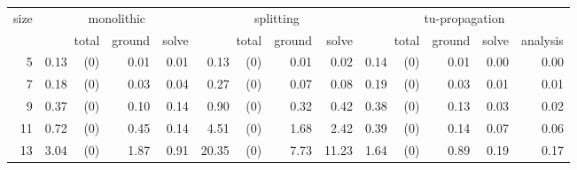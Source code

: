 \documentclass[11pt,fleqn,twoside]{article}
\begin{document}
			\begin{table}[t]
				\small
				\centering
				\setlength\tabcolsep{1.5pt}
				\begin{tabular}[t]{|r|r|r|r|r|r|r|r|r|r|r|}
					\hline
					size & \multicolumn{3}{c|}{monolithic} & \multicolumn{3}{c|}{splitting} & \multicolumn{4}{c|}{tu-propagation} \\
					& total & ground & solve & total & ground & solve & total & ground & solve & analysis \\
					\hline
5      & 0.13 ~~(0) & 0.01     & 0.01     & 0.13 ~~(0) & 0.01     & 0.02     & 0.14 ~~(0) & 0.01     & 0.00     & 0.00     \\
7      & 0.18 ~~(0) & 0.03     & 0.04     & 0.27 ~~(0) & 0.07     & 0.08     & 0.19 ~~(0) & 0.03     & 0.01     & 0.01     \\
9      & 0.37 ~~(0) & 0.10     & 0.14     & 0.90 ~~(0) & 0.32     & 0.42     & 0.38 ~~(0) & 0.13     & 0.03     & 0.02     \\
11      & 0.72 ~~(0) & 0.45     & 0.14     & 4.51 ~~(0) & 1.68     & 2.42     & 0.39 ~~(0) & 0.14     & 0.07     & 0.06     \\
13      & 3.04 ~~(0) & 1.87     & 0.91     & 20.35 ~~(0) & 7.73     & 11.23     & 1.64 ~~(0) & 0.89     & 0.19     & 0.17     \\

\end{tabular}
\end{table}
\end{document}
